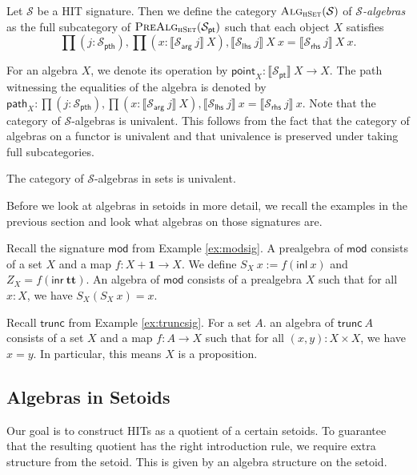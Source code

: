\documentclass[9pt]{entcs}
\newcommand{\type}[1]{\textsc{#1}}
\newcommand{\term}[1]{\mathsf{#1}}
\newcommand{\constructor}[1]{\mathbf{#1}}
\newcommand{\category}[1]{\textsc{#1}}
\newcommand{\function}[1]{\mathsf{#1}}
\newcommand{\deprod}[3]{\prod(#1 : #2), #3} %
\newcommand{\hset}{\type{hSet}} %
\newcommand{\0}{\textbf{0}} %
\newcommand{\unitt}{\textbf{1}} %
\newcommand{\TT}{\constructor{tt}} %
\newcommand{\inl}{\term{inl}} %
\newcommand{\inr}{\term{inr}} %
\newcommand{\Def}{:=} %
\newcommand{\pt}[0]{\textsf{pt}}
\newcommand{\pthI}[0]{\textsf{pth}}
\newcommand{\pthA}[0]{\textsf{arg}}
\newcommand{\pthlh}[0]{\textsf{lhs}}
\newcommand{\pthrh}[0]{\textsf{rhs}}
\newcommand{\pointc}[1]{#1_{\pt}} %
\newcommand{\pathI}[1]{#1_{\pthI}} %
\newcommand{\pathA}[1]{#1_{\pthA}} %
\newcommand{\pathlh}[1]{#1_{\pthlh}} %
\newcommand{\pathrh}[1]{#1_{\pthrh}} %
\newcommand{\modsig}{\function{mod}} %
\newcommand{\trunc}{\function{trunc}} %
\newcommand{\sig}{\mathcal{S}} %
\newcommand{\semP}[1]{\llbracket #1 \rrbracket} %
\newcommand{\prealg}[1]{\category{PreAlg}_{\hset}(#1)} %
\newcommand{\semE}[1]{\llbracket #1 \rrbracket} %
\newcommand{\Alg}[1]{\category{Alg}_{\hset}(#1)} %
\newcommand{\constrA}[1]{\function{point}_{#1}} %
\newcommand{\constrP}[1]{\function{path}_{#1}} %
\begin{document}
\begin{definition}
\label{def:algebra}
Let $\sig$ be a HIT signature.
Then we define the category $\Alg{\sig}$ of \emph{$\sig$-algebras} as the full subcategory of $\prealg{\pointc{\sig}}$ such that each object $X$ satisfies
\[
\deprod{j}{\pathI{\sig}}{\deprod{x}{\semP{\pathA{\sig} \> j} \> X}{\semE{\pathlh{\sig} \> j} \> X \> x = \semE{\pathrh{\sig} \> j} \> X \> x}}.
\]
\end{definition}

For an algebra $X$, we denote its operation by $\constrA{X} : \semP{\pointc{\sig}} \> X \rightarrow X$.
The path witnessing the equalities of the algebra is denoted by $\constrP{X} : \deprod{j}{\pathI{\sig}}{\deprod{x}{\semP{\pathA{\sig} \> j} \> X}{\semE{\pathlh{\sig} \> j} \> x = \semE{\pathrh{\sig} \> j} \> x}}$.
Note that the category of $\sig$-algebras is univalent.
This follows from the fact that the category of algebras on a functor is univalent and that univalence is preserved under taking full subcategories.

\begin{proposition}
\label{prop:univalg}
The category of $\sig$-algebras in sets is univalent.
\end{proposition}

Before we look at algebras in setoids in more detail, we recall the examples in the previous section and look what algebras on those signatures are.

\begin{example}
\label{ex:commalg}
Recall the signature $\modsig$ from Example \ref{ex:modsig}.
A prealgebra of $\modsig$ consists of a set $X$ and a map $f : X + \unitt \rightarrow X$.
We define $S_X \> x \Def f(\inl \> x)$ and $Z_X = f(\inr \> \TT)$.
An algebra of $\modsig$ consists of a prealgebra $X$ such that for all $x : X$, we have $S_X(S_X \> x) = x$.
\end{example}

\begin{example}
\label{ex:truncalg}
Recall $\trunc$ from Example \ref{ex:truncsig}.
For a set $A$. an algebra of $\trunc \> A$ consists of a set $X$ and a map $f : A \rightarrow X$ such that for all $(x , y) : X \times X$, we have $x = y$.
In particular, this means $X$ is a proposition.
\end{example}

\subsection{Algebras in Setoids}
Our goal is to construct HITs as a quotient of a certain setoids.
To guarantee that the resulting quotient has the right introduction rule, we require extra structure from the setoid.
This is given by an algebra structure on the setoid.
\end{document}
